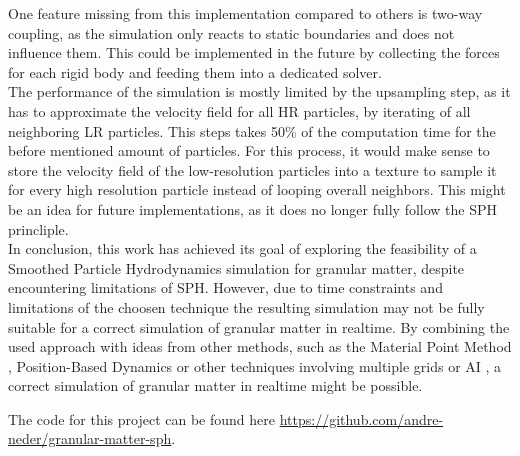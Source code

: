 \documentclass[intern]{cgMA}
\begin{document}
    One feature missing from this implementation compared to others is two-way coupling, as the simulation only reacts to static boundaries and does not influence them. This could be implemented in the future by collecting the forces for each rigid body and feeding them into a dedicated solver.\\
    The performance of the simulation is mostly limited by the upsampling step, as it has to approximate the velocity field for all HR particles, by iterating of all neighboring LR particles. This steps takes 50\% of the computation time for the before mentioned amount of particles. For this process, it would make sense to store the velocity field of the low-resolution particles into a texture to sample it for every high resolution particle instead of looping overall neighbors. This might be an idea for future implementations, as it does no longer fully follow the SPH princliple.\\
    In conclusion, this work has achieved its goal of exploring the feasibility of a Smoothed Particle Hydrodynamics simulation for granular matter, despite encountering limitations of SPH. However, due to time constraints and limitations of the choosen technique the resulting simulation may not be fully suitable for a correct simulation of granular matter in realtime. By combining the used approach with ideas from other methods, such as the Material Point Method \cite{BARDENHAGEN2000529}, Position-Based Dynamics\cite{10.2312:egt.20151045} or other techniques involving multiple grids \cite{Shao:2022:Multigrid} or AI \cite{sanchezgonzalez2020learning}, a correct simulation of granular matter in realtime might be possible. 

    The code for this project can be found here \url{https://github.com/andre-neder/granular-matter-sph}.
    \pagebreak
    \listoffigures
    \pagebreak
    \printbibliography
\end{document}
